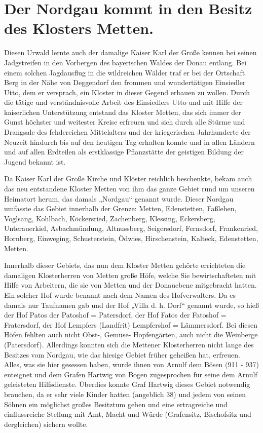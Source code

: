 \documentclass[12pt,a4paper]{book}
\begin{document}
\chapter{Der Nordgau kommt in den Besitz des Klosters Metten.}

Diesen Urwald lernte auch der damalige Kaiser Karl der Große kennen bei
seinen Jadgstreifen in den Vorbergen des bayerischen Waldes der Donau
entlang. Bei einem solchen Jagdausflug in die wildreichen Wälder traf er
bei der Ortschaft Berg in der Nähe von Deggendorf den frommen und
wundertätigen Einsiedler Utto, dem er versprach, ein Kloster in dieser
Gegend erbauen zu wollen. Durch die tätige und verständnisvolle Arbeit
des Einsiedlers Utto und mit Hilfe der kaiserlichen Unterstützung
entstand das Kloster Metten, das sich immer der Gunst höchster und
weitester Kreise erfreuen und sich durch alle Stürme und Drangsale des
fehdereichen Mittelalters und der kriegerischen Jahrhunderte der Neuzeit
hindurch bis auf den heutigen Tag erhalten konnte und in allen Ländern
und auf allen Erdteilen als erstklassige Pflanzstätte der geistigen
Bildung der Jugend bekannt ist.

Da Kaiser Karl der Große Kirche und Klöster reichlich beschenkte, bekam
auch das neu entstandene Kloster Metten von ihm das ganze Gebiet rund um
unseren Heimatort herum, das damals „Nordgau“ genannt wurde. Dieser
Nordgau umfasste das Gebiet innerhalb der Grenze: Metten, Edenstetten,
Faßlehen, Voglsang, Kohlbach, Köckersried, Zachenberg, Klessing,
Eckersberg, Unterauerkiel, Asbachmündung, Altnussberg, Seigersdorf,
Fernsdorf, Frankenried, Hornberg, Einweging, Schusterstein, Ödwies,
Hirschenstein, Kalteck, Edenstetten, Metten.

Innerhalb dieser Gebiets, das nun dem Kloster Metten gehörte errichteten
die damaligen Klosterherren von Metten große Höfe, welche Sie
bewirtschafteten mit Hilfe von Arbeitern, die sie von Metten und der
Donauebene mitgebracht hatten. Ein solcher Hof wurde benannt nach dem
Namen des Hofverwalters. Da es damals nur Taufnamen gab und der Hof
„Villa d. h. Dorf“ genannt wurde, so hieß der Hof Patos der Patoshof =
Patersdorf, der Hof Fatos der Fatoshof = Fratersdorf, der Hof Lempfers
(Landfrit) Lempfershof = Lämmersdorf. Bei diesen Höfen fehlten auch
nicht Obst-, Gemüse- Hopfengärten, auch nicht die Weinberge
(Patersdorf). Allerdings konnten sich die Mettener Klosterherren nicht
lange des Besitzes vom Nordgau, wie das hiesige Gebiet früher geheißen
hat, erfreuen. Alles, was sie hier gesessen haben, wurde ihnen von
Arnulf dem Bösen (911 - 937) enteignet und dem Grafen Hartwig von Bogen
zugesprochen für seine dem Arnulf geleisteten Hilfsdienste. Überdies
konnte Graf Hartwig dieses Gebiet notwendig brauchen, da er sehr viele
Kinder hatten (angeblich 38) und jedem von seinen Söhnen ein möglichst
großes Besitztum geben und eine ertragreiche und einflussreiche Stellung
mit Amt, Macht und Würde (Grafensitz, Bischofsitz und dergleichen)
sichern wollte.
\end{document}
